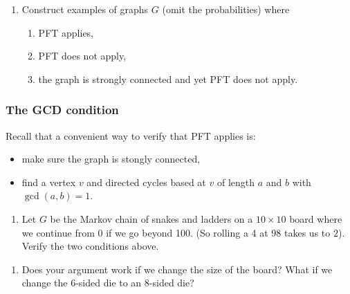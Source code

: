 \documentclass{amsart}
\begin{document}
\begin{enumerate}
\item Construct examples of graphs \(G\) (omit the probabilities) where
\begin{enumerate}
\item PFT applies,
\item PFT does not apply,
\item the graph is strongly connected and yet PFT does not apply.
\end{enumerate}
\end{enumerate}
\subsubsection{The GCD condition}
\label{sec:org7ca3479}
Recall that a convenient way to verify that PFT applies is:
\begin{itemize}
\item make sure the graph is stongly connected,
\item find a vertex \(v\) and directed cycles based at \(v\) of length \(a\) and \(b\) with \(\gcd(a,b) = 1\).
\end{itemize}


\begin{enumerate}
\item Let \(G\) be the Markov chain of snakes and ladders on a \(10 \times 10\) board where we continue from \(0\) if we go beyond 100. (So rolling a 4 at 98 takes us to \(2\)).
Verify the two conditions above.
\end{enumerate}

\begin{enumerate}
\item Does your argument work if we change the size of the board?
What if we change the \(6\)-sided die to an \(8\)-sided die?
\end{enumerate}
\end{document}
